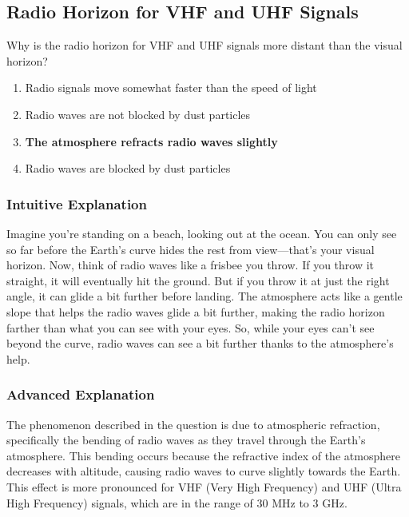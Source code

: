 \subsection{Radio Horizon for VHF and UHF Signals}
\label{T3C11}

\begin{tcolorbox}[colback=gray!10!white,colframe=black!75!black,title=T3C11]
Why is the radio horizon for VHF and UHF signals more distant than the visual horizon?
\begin{enumerate}[label=\Alph*)]
    \item Radio signals move somewhat faster than the speed of light
    \item Radio waves are not blocked by dust particles
    \item \textbf{The atmosphere refracts radio waves slightly}
    \item Radio waves are blocked by dust particles
\end{enumerate}
\end{tcolorbox}

\subsubsection{Intuitive Explanation}
Imagine you're standing on a beach, looking out at the ocean. You can only see so far before the Earth's curve hides the rest from view—that's your visual horizon. Now, think of radio waves like a frisbee you throw. If you throw it straight, it will eventually hit the ground. But if you throw it at just the right angle, it can glide a bit further before landing. The atmosphere acts like a gentle slope that helps the radio waves glide a bit further, making the radio horizon farther than what you can see with your eyes. So, while your eyes can't see beyond the curve, radio waves can see a bit further thanks to the atmosphere's help.

\subsubsection{Advanced Explanation}
The phenomenon described in the question is due to atmospheric refraction, specifically the bending of radio waves as they travel through the Earth's atmosphere. This bending occurs because the refractive index of the atmosphere decreases with altitude, causing radio waves to curve slightly towards the Earth. This effect is more pronounced for VHF (Very High Frequency) and UHF (Ultra High Frequency) signals, which are in the range of 30 MHz to 3 GHz.

